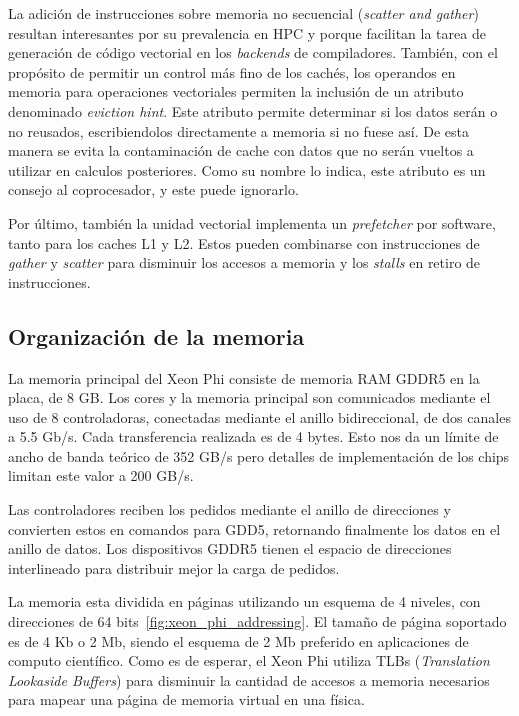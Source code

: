 La adici\'on de instrucciones sobre memoria no secuencial (\textit{scatter and gather}) resultan interesantes por su prevalencia
en HPC y porque facilitan la tarea de generaci\'on de c\'odigo vectorial en los \textit{backends} de compiladores. Tambi\'en, con
el prop\'osito de permitir un control m\'as fino de los cach\'es, los operandos en memoria para operaciones vectoriales permiten
la inclusi\'on de un atributo denominado \textit{eviction hint}. Este atributo permite determinar si los datos ser\'an o no
reusados, escribiendolos directamente a memoria si no fuese as\'i. De esta manera se evita la contaminaci\'on de cache con datos
que no ser\'an vueltos a utilizar en calculos posteriores. Como su nombre lo indica, este atributo es un consejo al coprocesador,
y este puede ignorarlo.

Por \'ultimo, tambi\'en la unidad vectorial implementa un \textit{prefetcher} por software, tanto para los caches L1 y L2. Estos
pueden combinarse con instrucciones de \textit{gather} y \textit{scatter} para disminuir los accesos a memoria y los \textit{stalls}
en retiro de instrucciones.

\subsection{Organizaci\'on de la memoria}

La memoria principal del Xeon Phi consiste de memoria RAM GDDR5 en la placa, de 8 GB. Los cores y la memoria principal son comunicados mediante el uso de 8
controladoras, conectadas mediante el anillo bidireccional, de dos canales a 5.5 Gb/s. Cada transferencia realizada es de 4 bytes. 
Esto nos da un l\'imite de ancho de banda te\'orico de 352 GB/s pero detalles de implementaci\'on de los chips limitan este valor a 200 GB/s. 

Las controladores reciben los pedidos mediante el anillo de direcciones y convierten estos en comandos para GDD5, retornando finalmente los datos en
el anillo de datos. Los dispositivos GDDR5 tienen el espacio de direcciones interlineado para distribuir mejor la carga de pedidos.

La memoria esta dividida en p\'aginas utilizando un esquema de 4 niveles, con direcciones de 64 bits~\ref{fig:xeon_phi_addressing}. El tama\~no de p\'agina soportado es de 4 Kb
o 2 Mb, siendo el esquema de 2 Mb preferido en aplicaciones de computo cient\'ifico. Como es de esperar, el Xeon Phi utiliza TLBs (\textit{Translation Lookaside
Buffers}) para disminuir la cantidad de accesos a memoria necesarios para mapear una p\'agina de memoria virtual en una f\'isica.

